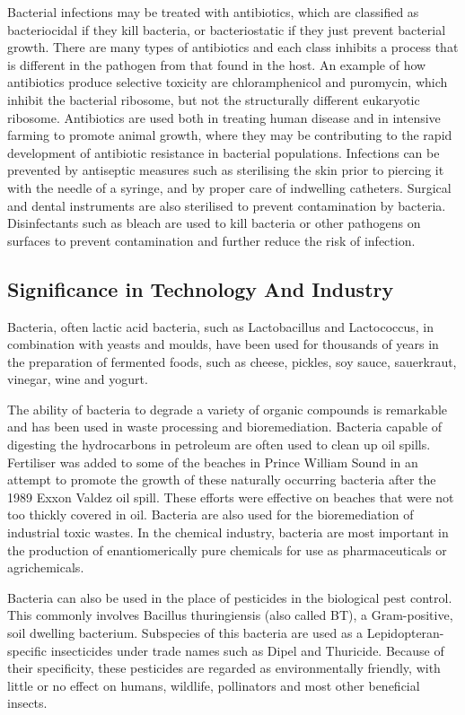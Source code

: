 Bacterial infections may be treated with antibiotics, which are classified as bacteriocidal if they kill bacteria, or bacteriostatic if they just prevent bacterial growth. There are many types of antibiotics and each class inhibits a process that is different in the pathogen from that found in the host. An example of how antibiotics produce selective toxicity are chloramphenicol and puromycin, which inhibit the bacterial ribosome, but not the structurally different eukaryotic ribosome. Antibiotics are used both in treating human disease and in intensive farming to promote animal growth, where they may be contributing to the rapid development of antibiotic resistance in bacterial populations. Infections can be prevented by antiseptic measures such as sterilising the skin prior to piercing it with the needle of a syringe, and by proper care of indwelling catheters. Surgical and dental instruments are also sterilised to prevent contamination by bacteria. Disinfectants such as bleach are used to kill bacteria or other pathogens on surfaces to prevent contamination and further reduce the risk of infection.

\hypertarget{significance-in-technology-and-industry}{%
\subsection{Significance in Technology And Industry}\label{significance-in-technology-and-industry}}

Bacteria, often lactic acid bacteria, such as Lactobacillus and Lactococcus, in combination with yeasts and moulds, have been used for thousands of years in the preparation of fermented foods, such as cheese, pickles, soy sauce, sauerkraut, vinegar, wine and yogurt.

The ability of bacteria to degrade a variety of organic compounds is remarkable and has been used in waste processing and bioremediation. Bacteria capable of digesting the hydrocarbons in petroleum are often used to clean up oil spills. Fertiliser was added to some of the beaches in Prince William Sound in an attempt to promote the growth of these naturally occurring bacteria after the 1989 Exxon Valdez oil spill. These efforts were effective on beaches that were not too thickly covered in oil. Bacteria are also used for the bioremediation of industrial toxic wastes. In the chemical industry, bacteria are most important in the production of enantiomerically pure chemicals for use as pharmaceuticals or agrichemicals.

Bacteria can also be used in the place of pesticides in the biological pest control. This commonly involves Bacillus thuringiensis (also called BT), a Gram-positive, soil dwelling bacterium. Subspecies of this bacteria are used as a Lepidopteran-specific insecticides under trade names such as Dipel and Thuricide. Because of their specificity, these pesticides are regarded as environmentally friendly, with little or no effect on humans, wildlife, pollinators and most other beneficial insects.


